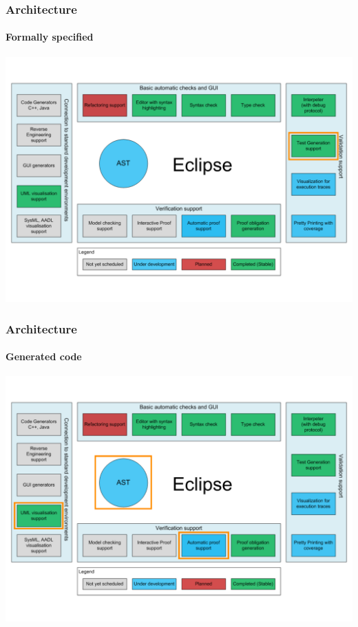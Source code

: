 \documentclass[slidestop,uncompress,mathserif,final]{beamer}
\begin{document}
\begin{frame}[c]
  \frametitle{Architecture}
  \framesubtitle{Formally specified}

  \begin{center}
    \includegraphics[width=\textwidth]{images/overture_arch_spec.pdf}
  \end{center}
\end{frame}

\begin{frame}[c]
  \frametitle{Architecture}
  \framesubtitle{Generated code}

  \begin{center}
    \includegraphics[width=\textwidth]{images/overture_arch_cg.pdf}
  \end{center}
\end{frame}
\end{document}
